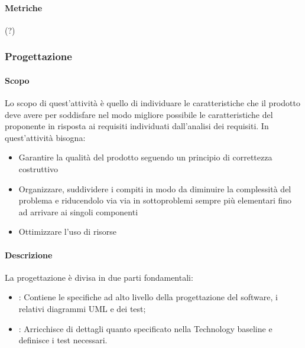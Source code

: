 \documentclass[../norme_di_progetto.tex]{subfiles}
\begin{document}
\paragraph{Metriche}
 (?)
 
 
 \subsubsection{Progettazione}
 
 \paragraph{Scopo}
 Lo scopo di quest'attività è quello di individuare le caratteristiche che il prodotto deve avere per soddisfare nel modo migliore possibile le caratteristiche del proponente in risposta ai requisiti individuati dall'analisi dei requisiti. In quest'attività bisogna:
 \begin{itemize}
     \item Garantire la qualità del prodotto seguendo un principio di correttezza costruttivo
     \item Organizzare, suddividere i compiti in modo da diminuire la complessità del problema e riducendolo via via in sottoproblemi sempre più elementari fino ad arrivare ai singoli componenti
     \item Ottimizzare l'uso di risorse
 \end{itemize}
 
 \paragraph{Descrizione}
 La progettazione è divisa in due parti fondamentali:
 \begin{itemize}
     \item {}: Contiene le specifiche ad alto livello della progettazione del software, i relativi diagrammi UML e dei test;
     \item {}: Arricchisce di dettagli quanto specificato nella Technology baseline e definisce i test necessari.
 \end{itemize}
 
\end{document}
